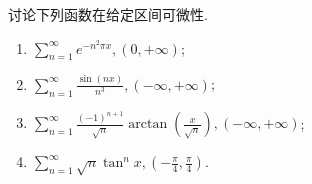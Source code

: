 \documentclass[../../main.tex]{subfiles}%
\begin{document}
\begin{example}
讨论下列函数在给定区间可微性.
\begin{enumerate}
\item \(\sum_{n=1}^{\infty} e^{-n^2 \pi x}, (0, +\infty)\);

\item \(\sum_{n=1}^{\infty} \frac{\sin(nx)}{n^3}, (-\infty, +\infty)\);

\item \(\sum_{n=1}^{\infty} \frac{(-1)^{n+1}}{\sqrt{n}} \arctan \left( \frac{x}{\sqrt{n}} \right), (-\infty, +\infty)\);

\item \(\sum_{n=1}^{\infty} \sqrt{n} \tan^n x, \left( -\frac{\pi}{4}, \frac{\pi}{4} \right)\).
\end{enumerate}
\end{example}
\end{document}
